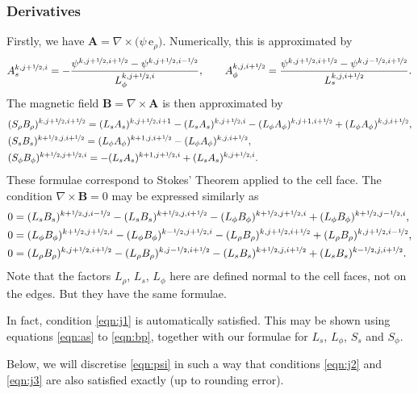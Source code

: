 \documentclass[11pt]{article}
\newcommand{\half}{\nicefrac{1}{2}}
\newcommand{\Ab}{\boldsymbol{A}}
\newcommand{\Bb}{\boldsymbol{B}}
\newcommand{\evr}{\,\mathrm{e}_\rho}
\begin{document}
\subsubsection{Derivatives}

Firstly, we have $\Ab = \nabla\times\big(\psi\evr\big)$. Numerically, this is approximated by
\begin{equation}
A_s^{k,j+\half,i} = -\frac{\psi^{k,j+\half,i+\half} - \psi^{k,j+\half,i-\half}}{L_\phi^{k,j+\half,i}}, \qquad A_\phi^{k,j,i+\half} = \frac{\psi^{k,j+\half,i+\half} - \psi^{k,j-\half,i+\half}}{L_s^{k,j,i+\half}}.
\label{eqn:as}
\end{equation}
The magnetic field $\Bb = \nabla\times\Ab$ is then approximated by
\begin{align}
&(S_\rho B_\rho)^{k,j+\half,i+\half} = (L_s A_s)^{k,j+\half,i+1} - (L_s A_s)^{k,j+\half,i} - (L_\phi A_\phi)^{k,j+1,i+\half} + (L_\phi A_\phi)^{k,j,i+\half},\\
&(S_s B_s)^{k+\half,j,i+\half} = (L_\phi A_\phi)^{k+1,j,i+\half} - (L_\phi A_\phi)^{k,j,i+\half},\\
&(S_\phi B_\phi)^{k+\half,j+\half,i} =  - (L_s A_s)^{k+1,j+\half,i} + (L_s A_s)^{k,j+\half,i}. \label{eqn:bp}
\end{align}
These formulae correspond to Stokes' Theorem applied to the cell face.
The condition $\nabla\times\Bb=0$ may be expressed similarly as
\begin{align}
&0 = (L_s B_s)^{k+\half,j,i-\half} - (L_s B_s)^{k+\half,j,i+\half} - (L_\phi B_\phi)^{k+\half,j+\half,i} + (L_\phi B_\phi)^{k+\half,j-\half,i},\label{eqn:j1}\\
&0 = (L_\phi B_\phi)^{k+\half,j+\half,i} - (L_\phi B_\phi)^{k-\half,j+\half,i} - (L_\rho B_\rho)^{k,j+\half,i+\half} + (L_\rho B_\rho)^{k,j+\half,i-\half},\label{eqn:j2}\\
&0 = (L_\rho B_\rho)^{k,j+\half,i+\half} - (L_\rho B_\rho)^{k,j-\half,i+\half} - (L_s B_s)^{k+\half,j,i+\half} + (L_s B_s)^{k-\half,j,i+\half}.\label{eqn:j3}
\end{align}
Note that the factors $L_\rho$, $L_s$, $L_\phi$ here are defined normal to the cell faces, not on the edges. But they have the same formulae.

In fact, condition \eqref{eqn:j1} is automatically satisfied. This may be shown using equations \eqref{eqn:as} to \eqref{eqn:bp}, together with our formulae for $L_s$, $L_\phi$, $S_s$ and $S_\phi$.

Below, we will discretise \eqref{eqn:psi} in such a way that conditions \eqref{eqn:j2} and \eqref{eqn:j3} are also satisfied exactly (up to rounding error).
\end{document}
